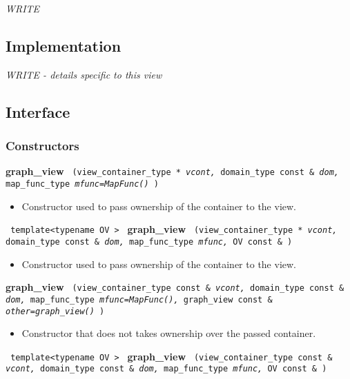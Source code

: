 \textit{WRITE}

\subsection{Implementation}

\textit{WRITE - details specific to this view}

\subsection{Interface} \label{sec-graf-vw-inter}

\subsubsection{Constructors}

\noindent
\textbf{graph\_view}%
\texttt{%
(view\_container\_type *
\textit{vcont,}%
domain\_type const \&
\textit{dom,}%
map\_func\_type
\textit{mfunc=MapFunc()}%
)
}

\begin{itemize}
\item
Constructor used to pass ownership of the container to the view.
\end{itemize}

\noindent
\texttt{%
template<typename OV >
}
\newline
\textbf{graph\_view}%
\texttt{%
(view\_container\_type *
\textit{vcont,}%
domain\_type const \&
\textit{dom,}%
map\_func\_type
\textit{mfunc,}%
OV const \&
)
}

\begin{itemize}
\item
Constructor used to pass ownership of the container to the view.
\end{itemize}

\noindent
\textbf{graph\_view}%
\texttt{%
(view\_container\_type const \&
\textit{vcont,}%
domain\_type const \&
\textit{dom,}%
map\_func\_type
\textit{mfunc=MapFunc(),}%
graph\_view const \&
\textit{other=graph\_view()}%
)
}

\begin{itemize}
\item
Constructor that does not takes ownership over the passed container.
\end{itemize}

\noindent
\texttt{%
template<typename OV >
}
\newline
\textbf{graph\_view}%
\texttt{%
(view\_container\_type const \&
\textit{vcont,}%
domain\_type const \&
\textit{dom,}%
map\_func\_type
\textit{mfunc,}%
OV const \&
)
}

